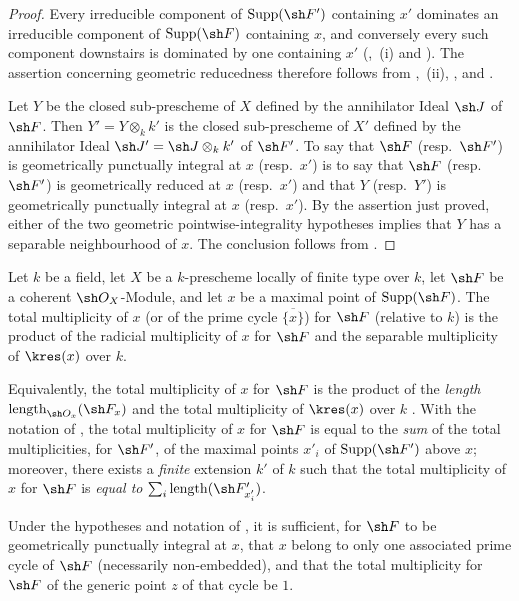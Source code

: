 \begin{proof}
Every irreducible component of $\operatorname{Supp}(\sh F')$
containing $x'$ dominates an irreducible component of
$\operatorname{Supp}(\sh F)$ containing $x$, and conversely every
such component downstairs is dominated by one containing $x'$
(,~(i) and ).
The assertion concerning geometric reducedness therefore follows
from ,~(ii), , and
.

Let $Y$ be the closed sub-prescheme of $X$ defined by the annihilator
Ideal $\sh J$ of $\sh F$.
Then $Y'=Y\otimes_k k'$ is the closed sub-prescheme of $X'$ defined by
the annihilator Ideal
$\sh J'=\sh J\otimes_k k'$ of $\sh F'$.
To say that $\sh F$ (resp.\ $\sh F'$) is geometrically punctually
integral at $x$ (resp.\ $x'$) is to say that $\sh F$ (resp.\
$\sh F'$) is geometrically reduced at $x$ (resp.\ $x'$) and that
$Y$ (resp.\ $Y'$) is geometrically punctually integral at $x$
(resp.\ $x'$).
By the assertion just proved, either of the two geometric
pointwise-integrality hypotheses implies that $Y$ has a separable
neighbourhood of $x$.
The conclusion follows from .
\end{proof}

\begin{definition}[4.7.12]
\label{IV.4.7.12}
Let $k$ be a field, let $X$ be a $k$-prescheme locally of finite type
over $k$, let $\sh F$ be a coherent $\sh O_X$-Module, and let $x$ be
a maximal point of $\operatorname{Supp}(\sh F)$.
The
total multiplicity of $x$ (or of the prime cycle
$\overline{\{x\}}$) for $\sh F$ (relative to $k$) is the product of
the radicial multiplicity of $x$ for $\sh F$ and the separable
multiplicity of $\kres(x)$ over $k$.
\end{definition}

Equivalently, the total multiplicity of $x$ for $\sh F$ is the
product of the \emph{length}
$\operatorname{length}_{\sh O_x}(\sh F_x)$ and the total
multiplicity of $\kres(x)$ over $k$ .
With the notation of , the total multiplicity of $x$
for $\sh F$ is equal to the \emph{sum} of the total multiplicities, for $\sh F'$, of
the maximal points $x'_i$ of $\operatorname{Supp}(\sh F')$ above $x$;
moreover, there exists a \emph{finite} extension $k'$ of $k$ such that the total
multiplicity of $x$ for $\sh F$ is \emph{equal to} $\sum_i\operatorname{length}(\sh F'_{x'_i})$.

\begin{proposition}[4.7.13]
\label{IV.4.7.13}
Under the hypotheses and notation of , it is
sufficient, for $\sh F$ to be geometrically punctually integral at
$x$, that $x$ belong to only one associated prime cycle of $\sh F$
(necessarily non-embedded), and that the total multiplicity for
$\sh F$ of the generic point $z$ of that cycle be $1$.
\end{proposition}

